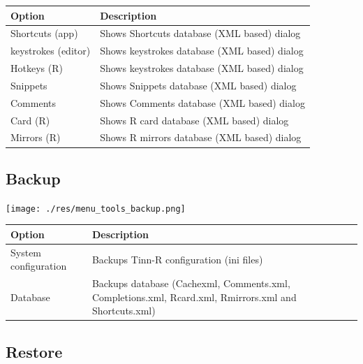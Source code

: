 \begin{scriptsize}
  \begin{tabularx}{\textwidth}{>{\hsize=0.3\hsize}X>{\hsize=0.7\hsize}X}\\
    \hline
    \textbf{Option} & \textbf{Description} \\
    \hline
    Shortcuts (app) & Shows Shortcuts database (XML based) dialog \\
    keystrokes (editor) & Shows keystrokes database (XML based) dialog \\
    Hotkeys (R) & Shows keystrokes database (XML based) dialog \\
    Snippets & Shows Snippets database (XML based) dialog \\
    Comments & Shows Comments database (XML based) dialog \\
    Card (R) & Shows R card database (XML based) dialog \\
    Mirrors (R) & Shows R mirrors database (XML based) dialog \\
    \hline
  \end{tabularx}
\end{scriptsize}


\hypertarget{menu_tools_backup}{}
\subsection{Backup}

\texttt{[image: ./res/menu\_tools\_backup.png]}\\

\begin{scriptsize}
  \begin{tabularx}{\textwidth}{>{\hsize=0.3\hsize}X>{\hsize=0.7\hsize}X}\\
    \hline
    \textbf{Option} & \textbf{Description} \\
    \hline
    System configuration & Backups Tinn-R configuration (ini files) \\
    Database & Backups database (Cachexml, Comments.xml, Completions.xml, Rcard.xml,
     Rmirrors.xml and Shortcuts.xml) \\
    \hline
  \end{tabularx}
\end{scriptsize}


\hypertarget{menu_tools_restore}{}
\subsection{Restore}

